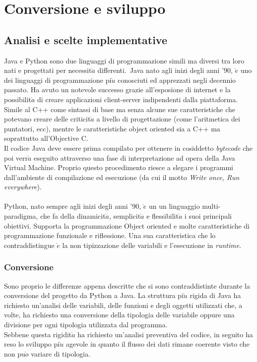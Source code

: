 \chapter{Conversione e sviluppo}

\section{Analisi e scelte implementative}
Java e Python sono due linguaggi di programmazione simili ma diversi tra loro nati e progettati per necessit$\grave{a}$ differenti.\
Java nato agli inizi degli anni '90, $\grave{e}$ uno dei linguaggi di programmazione pi$\grave{u}$ conosciuti ed apprezzati
negli decennio passato. Ha avuto un notevole successo grazie all'esposione di internet e la possibilit$\grave{a}$
di creare applicazioni client-server indipendenti dalla piattaforma. Simile al C++ come sintassi di base
ma senza alcune sue caratteristiche che potevano creare delle criticit$\grave{a}$ a livello di progettazione
(come l'aritmetica dei puntatori, ecc)\cite{new_2}, mentre le caratteristiche object oriented sia
a C++ ma soprattutto all'Objective C.\\
Il codice Java deve essere prima compilato per ottenere in cosiddetto \textit{bytecode} che poi verr$\grave{a}$
eseguito attraverso una fase di interpretazione ad opera della Java Virtual Machine. Proprio questo procedimento
riesce a slegare i programmi dall'ambiente di compilazione ed esecuzione (da cui il motto \textit{Write once, Run everywhere}). \\
\\
Python, nato sempre agli inizi degli anni '90, $\grave{e}$ un un linguaggio multi-paradigma, che fa della dinamicit$\grave{a}$,
semplicit$\grave{a}$ e flessibilit$\grave{a}$ i suoi principali obiettivi. Supporta la programmazione Object oriented e molte
caratteristiche di programmazione funzionale e riflessione. Una sua caratteristica che lo contraddistingue $\grave{e}$ la
non tipizzazione delle variabili e l'esecuzione in \textit{runtime}.\\

\subsection{Conversione}
Sono proprio le differenze appena descritte che si sono contraddistinte durante la conversione del progetto da Python a Java.
La struttura pi$\grave{u}$ rigida di Java ha richiesto un'analisi delle variabili, delle funzioni e degli oggetti utilizzati che,
a volte, ha richiesto una conversione della tipologia delle variabile oppure una divisione per ogni tipologia utilizzata dal programma.\\
Sebbene questa rigidit$\grave{a}$ ha richiesto un'analisi preventiva del codice, in seguito ha reso lo sviluppo pi$\grave{u}$ agevole in quanto
il flusso dei dati rimane coerente visto che non pu$\grave{o}$ variare di tipologia.

